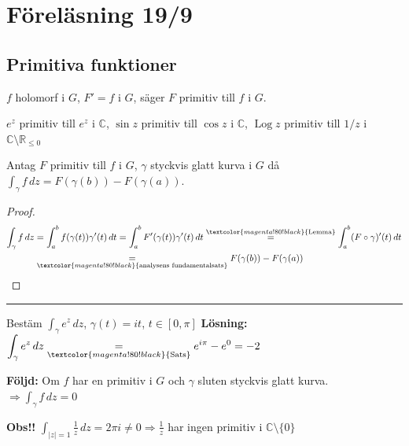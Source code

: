 \section{Föreläsning 19/9}

\subsection{Primitiva funktioner}
$f$ holomorf i $G$, $F' = f$ i $G$, säger $F$ primitiv till $f$ i $G$.

\begin{example}
$e^z$ primitiv till $e^z$ i $\mathbb{C}$, $\sin z$ primitiv till $\cos z$ i $\mathbb{C}$, $\operatorname{Log} z$ primitiv till $1/z$ i $\mathbb{C} \setminus \mathbb{R}_{\le 0}$
\end{example}

\begin{theorem}[Sats 4.11]
Antag $F$ primitiv till $f$ i $G$, $\gamma$ styckvis glatt kurva i $G$ då $\displaystyle\int_\gamma f\,dz = F(\gamma(b)) - F(\gamma(a))$.
\end{theorem}
\begin{proof}
\begin{align*}
  \int_\gamma f\,dz &= \int_a^b f(\gamma(t))\gamma'(t)\,dt = \int_a^b F'(\gamma(t))\gamma'(t)\,dt \overset{\textcolor{magenta!80!black}{\text{Lemma}}}{=} \int_a^b (F \circ \gamma)'(t)\,dt \\
  &\underset{\textcolor{magenta!80!black}{\text{analysens fundamentalsats}}}{=} F(\gamma(b)) - F(\gamma(a))
\end{align*}
\end{proof}

\noindent\rule{\linewidth}{0.4pt}

\begin{example}
Bestäm $\displaystyle\int_\gamma e^z\,dz$, $\gamma(t) = it$, $t \in [0, \pi]$
\textbf{Lösning:} $\displaystyle\int_\gamma e^z\,dz \underset{\textcolor{magenta!80!black}{\text{Sats}}}{=} e^{i\pi} - e^0 = -2$
\end{example}

\textcolor{red!70!black}{\textbf{Följd:}} Om $f$ har en primitiv i $G$ och $\gamma$ sluten styckvis glatt kurva. $\Rightarrow \displaystyle\int_\gamma f\,dz = 0$

\textcolor{red!70!black}{\textbf{Obs!!}} $\displaystyle\int_{|z| = 1} \frac{1}{z}\,dz = 2\pi i \neq 0 \Rightarrow \frac{1}{z}$ har ingen primitiv i $\mathbb{C} \setminus \{0\}$

